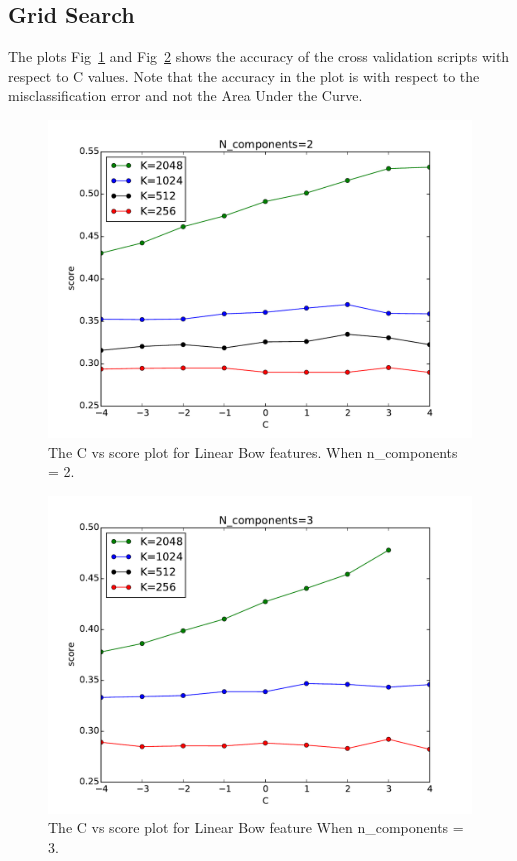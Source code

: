 \documentclass[final,leqno,onefignum,onetabnum]{siamltexmm}
\begin{document}
\subsection{Grid Search}
The plots Fig~\ref{fig:bowf_score2} and Fig~\ref{fig:bowf_score3} shows the accuracy of the cross validation scripts with respect to C values.  Note that the accuracy in the plot is with respect to the misclassification error and not the Area Under the Curve.
\begin{figure}
  \centering
  \includegraphics[width=0.60\linewidth]{images/score2Components}
  \caption{The C vs score plot for Linear Bow features. When n\_components = 2.\label{fig:bowf_score2}}
\end{figure}

\begin{figure}
  \centering
  \includegraphics[width=0.60\linewidth]{images/score3Components}
  \caption{The C vs score plot for Linear Bow feature When n\_components = 3.\label{fig:bowf_score3}}
\end{figure}
\end{document}
